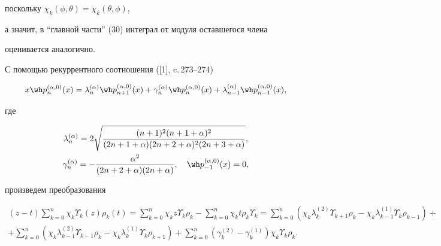 поскольку $\chi_k(\phi,\theta)=\chi_k(\theta,\phi)$,


а значит, в ``главной части'' (30) интеграл от модуля оставшегося члена


оценивается аналогично.





С помощью рекуррентного соотношения ([1], c.\,273--274)


$$


x\wh p_n^{(\alpha,0)} (x)=\lambda_n^{(\alpha )} \wh


p_{n+1}^{(\alpha,0)} (x)


+\gamma_n^{(\alpha )} \wh p_{n}^{(\alpha,0)} (x)+


\lambda_{n-1}^{(\alpha )} \wh p_{n-1}^{(\alpha,0)} (x),


$$


где


\begin{gather}


\lambda_n^{(\alpha )}= 2\sqrt{\frac{(n+1)^2(n+1+\alpha)^2}


{(2n+1+\alpha)(2n+2+\alpha)^2(2n+3+\alpha)}}, \\


%


\gamma_n^{(\alpha )} =-\frac{\alpha^2}


{(2n+2+\alpha)(2n+\alpha)},\quad


\wh p_{-1}^{(\alpha,0)} (x)=0,\notag


\end{gather}


произведем преобразования


\begin{multline*}


(z-t)\sum_{k=0}^n\chi_k \Upsilon_k(z)\rho_k(t)=


\sum_{k=0}^n \chi_k z \Upsilon_k \rho_k -


\sum_{k=0}^n\chi_k t \rho_k \Upsilon_k =


\sum_{k=0}^n (\chi_k \lambda_k^{(2)}\Upsilon_{k+1} \rho_k -


\chi_k \lambda_{k-1}^{(1)}\Upsilon_k \rho_{k-1})+ \\


%


+\sum_{k=0}^n (\chi_k \lambda_{k-1}^{(2)}\Upsilon_{k-1} \rho_k -


\chi_k \lambda_k^{(1)}\Upsilon_k \rho_{k+1})+


\sum_{k=0}^n (\gamma_k^{(2)}-\gamma_k^{(1)}


)\chi_k \Upsilon_k \rho_k.


\end{multline*}


